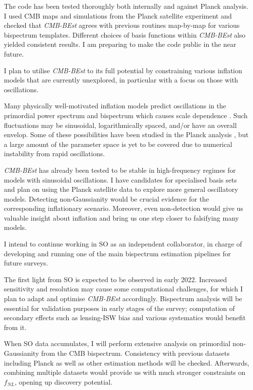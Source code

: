 The code has been tested thoroughly both internally and against Planck analysis. I used CMB maps and simulations from the Planck satellite experiment and checked that \textit{CMB-BEst} agrees with previous routines map-by-map for various bispectrum templates. Different choices of basis functions within \textit{CMB-BEst} also yielded consistent results. I am preparing to make the code public in the near future.


I plan to utilise \textit{CMB-BEst} to its full potential by constraining various inflation models that are currently unexplored, in particular with a focus on those with oscillations.

Many physically well-motivated inflation models predict oscillations in the primordial power spectrum and bispectrum which causes scale dependence \cite{Chen2010,Chluba2015}. Such fluctuations may be sinusoidal, logarithmically spaced, and/or have an overall envelop. Some of these possibilities have been studied in the Planck analysis \cite{PlanckCollaboration2018}, but a large amount of the parameter space is yet to be covered due to numerical instability from rapid oscillations.

\textit{CMB-BEst} has already been tested to be stable in high-frequency regimes for models with sinusoidal oscillations. I have candidates for specialised basis sets and plan on using the Planck satellite data to explore more general oscillatory models. Detecting non-Gaussianity would be crucial evidence for the corresponding inflationary scenario. Moreover, even non-detection would give us valuable insight about inflation and bring us one step closer to falsifying many models.


I intend to continue working in SO as an independent collaborator, in charge of developing and running one of the main bispectrum estimation pipelines for future surveys.

The first light from SO is expected to be observed in early 2022. Increased sensitivity and resolution may cause some computational challenges, for which I plan to adapt and optimise \textit{CMB-BEst} accordingly. Bispectrum analysis will be essential for validation purposes in early stages of the survey; computation of secondary effects such as lensing-ISW bias and various systematics would benefit from it.

When SO data accumulates, I will perform extensive analysis on primordial non-Gaussianity from the CMB bispectrum. Consistency with previous datasets including Planck as well as other estimation methods will be checked. Afterwards, combining multiple datasets would provide us with much stronger constraints on $f_{NL}$, opening up discovery potential. 

